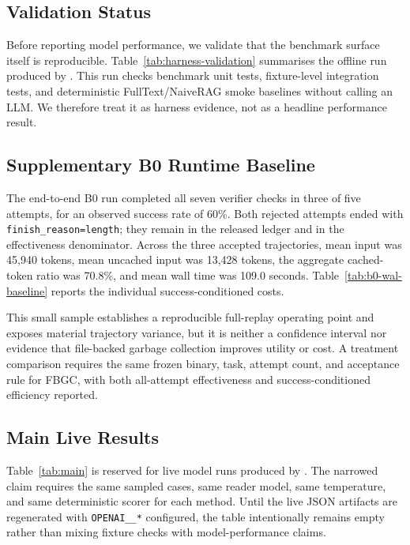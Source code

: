 \subsection{Validation Status}

Before reporting model performance, we validate that the benchmark
surface itself is reproducible. Table~\ref{tab:harness-validation}
summarises the offline run produced by
. This run
checks benchmark unit tests, fixture-level integration tests, and
deterministic FullText/NaiveRAG smoke baselines without calling an LLM.
We therefore treat it as harness evidence, not as a headline
performance result.



\subsection{Supplementary B0 Runtime Baseline}

The end-to-end B0 run completed all seven verifier checks in three of
five attempts, for an observed success rate of 60\%. Both rejected
attempts ended with \texttt{finish\_reason=length}; they remain in the
released ledger and in the effectiveness denominator. Across the three
accepted trajectories, mean input was 45,940 tokens, mean uncached input
was 13,428 tokens, the aggregate cached-token ratio was 70.8\%, and mean
wall time was 109.0 seconds. Table~\ref{tab:b0-wal-baseline} reports the
individual success-conditioned costs.



This small sample establishes a reproducible full-replay operating
point and exposes material trajectory variance, but it is neither a
confidence interval nor evidence that file-backed garbage collection
improves utility or cost. A treatment comparison requires the same
frozen binary, task, attempt count, and acceptance rule for FBGC, with
both all-attempt effectiveness and success-conditioned efficiency
reported.

\subsection{Main Live Results}

Table~\ref{tab:main} is reserved for live model runs produced by
. The narrowed
claim requires the same sampled cases, same reader model, same
temperature, and same deterministic scorer for each method. Until the
live JSON artifacts are regenerated with \texttt{OPENAI\_\_*}
configured, the table intentionally remains empty rather than mixing
fixture checks with model-performance claims.

